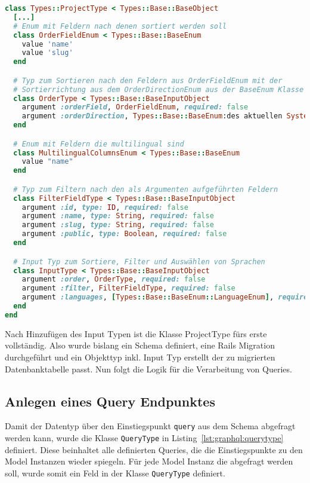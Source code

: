 \begin{lstlisting}[language=Ruby,float=h!,caption={Definition der Input Typen in \lstinline|/graphql/types/project_type.rb|}, label={lst:graphql:inputtype}]
class Types::ProjectType < Types::Base::BaseObject
  [...]
  # Enum mit Feldern nach denen sortiert werden soll 
  class OrderFieldEnum < Types::Base::BaseEnum
    value 'name'
    value 'slug'
  end

  # Typ zum Sortieren nach den Feldern aus OrderFieldEnum mit der
  # Sortierrichtung aus dem OrderDirectionEnum aus der BaseEnum Klasse
  class OrderType < Types::Base::BaseInputObject
    argument :orderField, OrderFieldEnum, required: false
    argument :orderDirection, Types::Base::BaseEnum:des aktuellen Systems mit GraphQL:OrderDirectionEnum, required: false
  end

  # Enum mit Feldern die multilingual sind
  class MultilingualColumnsEnum < Types::Base::BaseEnum
    value "name"
  end

  # Typ zum Filtern nach den als Argumenten aufgeführten Feldern
  class FilterFieldType < Types::Base::BaseInputObject
    argument :id, type: ID, required: false
    argument :name, type: String, required: false
    argument :slug, type: String, required: false
    argument :public, type: Boolean, required: false
  end

  # Input Typ zum Sortiere, Filter und Auswählen von Sprachen
  class InputType < Types::Base::BaseInputObject
    argument :order, OrderType, required: false
    argument :filter, FilterFieldType, required: false
    argument :languages, [Types::Base::BaseEnum::LanguageEnum], required: false
  end
end
\end{lstlisting}

Nach Hinzufügen des Input Typen ist die Klasse ProjectType fürs erste vollständig.
Also wurde bislang ein Schema definiert, eine Rails Migration durchgeführt und ein Objekttyp inkl. Input Typ erstellt der zu migrierten Datenbanktabelle passt. Nun folgt die Logik für die Verarbeitung von Queries.


\subsection{Anlegen eines Query Endpunktes}
\label{impl:graphql:querytype}
Damit der Datentyp über den Einstiegspunkt \lstinline|query| aus dem Schema abgefragt werden kann, wurde die Klasse \lstinline|QueryType| in Listing~\ref{lst:graphql:querytype} definiert.
Diese beinhaltet alle definierten Queries, die die Einstiegspunkte zu den Model Instanzen wieder spiegeln. Für jede Model Instanz die abgefragt werden soll, wurde somit ein Feld in der Klasse \lstinline|QueryType| definiert.


